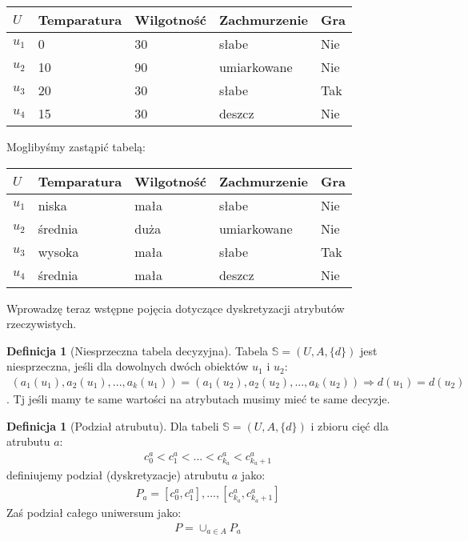 \documentclass[magisterska]{pracamgr}
\theoremstyle{plain}
\theoremstyle{definition}
\newtheorem{definicja}[thm]{Definicja}
\theoremstyle{remark}
\begin{document}
\begin{center}
 \begin{tabular}{l || P{2.5cm} P{2.5cm} P{2.5cm} | P{1.5cm}}
  $U$     & Temparatura & Wilgotność & Zachmurzenie & Gra \\ 
  \hline
  $u_{1}$ & 0      & 30      & słabe          & Nie \\
  $u_{2}$ & 10     & 90      & umiarkowane    & Nie \\
  $u_{3}$ & 20     & 30      & słabe   	      & Tak \\
  $u_{4}$ & 15     & 30      & deszcz         & Nie \\
 \end{tabular}
\end{center}

Moglibyśmy zastąpić tabelą:

\begin{center}
 \begin{tabular}{l || P{2.5cm} P{2.5cm} P{2.5cm} | P{1.5cm}}
  $U$     & Temparatura & Wilgotność & Zachmurzenie & Gra \\ 
  \hline
  $u_{1}$ & niska      & mała      & słabe          & Nie \\
  $u_{2}$ & średnia    & duża      & umiarkowane    & Nie \\
  $u_{3}$ & wysoka     & mała      & słabe   	    & Tak \\
  $u_{4}$ & średnia    & mała      & deszcz         & Nie \\
 \end{tabular}
\end{center}

\newpage
Wprowadzę teraz wstępne pojęcia dotyczące dyskretyzacji atrybutów rzeczywistych.


\begin{definicja}[Niesprzeczna tabela decyzyjna]
Tabela  $\mathbb{S} =(U, A, \{d\} )$  jest niesprzeczna, jeśli dla dowolnych dwóch obiektów $u_{1}$ i $u_{2}$:
  \begin{align*}
     (a_{1}(u_{1}), a_{2}(u_{1}), ..., a_{k}(u_{1})) = (a_{1}(u_{2}), a_{2}(u_{2}), ..., a_{k}(u_{2})) \Rightarrow 
     d(u_{1}) = d(u_{2})
  \end{align*}.
Tj jeśli mamy te same wartości na atrybutach musimy mieć te same decyzje.
\end{definicja}

\begin{definicja}[Podział atrubutu]
Dla tabeli  $\mathbb{S} =(U, A, \{d\} )$  i zbioru cięć dla atrubutu $a$:
\begin{align*}
     c_{0}^{a} < c_{1}^{a} < ... < c_{k_{a}}^{a} < c_{k_{a} + 1}^{a}
  \end{align*}
definiujemy podział (dyskretyzacje) atrubutu $a$ jako:
  \begin{align*}
     P_{a} = {[c_{0}^{a}, c_{1}^{a}], ... , [c_{k_{a}}^{a}, c_{k_{a} + 1}^{a}]}
  \end{align*}
Zaś podział całego uniwersum jako:
  \begin{align*}
     P = \cup_{a \in A} P_{a}
  \end{align*}
\end{definicja}
\end{document}
